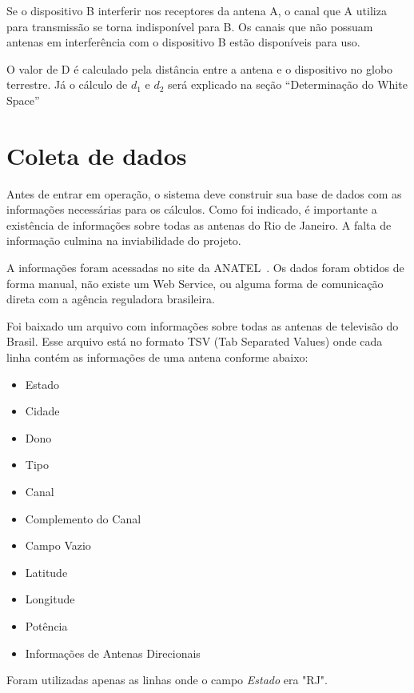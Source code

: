 Se o dispositivo B interferir nos receptores da antena A, o canal que A utiliza para transmissão se torna indisponível para B. Os canais que não possuam antenas em interferência com o dispositivo B estão disponíveis para uso.

O valor de D é calculado pela distância entre a antena e o dispositivo no globo terrestre. Já o cálculo de \begin{math}d_1\end{math} e \begin{math}d_2\end{math} será explicado na seção ``Determinação do White Space''


\section{Coleta de dados}

Antes de entrar em operação, o sistema deve construir sua base de dados com as informações necessárias para os cálculos. Como foi indicado, é importante a existência de informações sobre todas as antenas do Rio de Janeiro. A falta de informação culmina na inviabilidade do projeto.

A informações foram acessadas no site da ANATEL~\cite{siscom}. Os dados foram obtidos de forma manual, não existe um Web Service, ou alguma forma de comunicação direta com a agência reguladora brasileira.

Foi baixado um arquivo com informações sobre todas as antenas de televisão do Brasil. Esse arquivo está no formato TSV (Tab Separated Values) onde cada linha contém as informações de uma antena conforme abaixo:

\begin{itemize}
\item Estado
\item Cidade
\item Dono
\item Tipo
\item Canal
\item Complemento do Canal 
\item Campo Vazio
\item Latitude 
\item Longitude 
\item Potência
\item Informações de Antenas Direcionais
\end{itemize}

Foram utilizadas apenas as linhas onde o campo \textit{Estado} era "RJ". 

